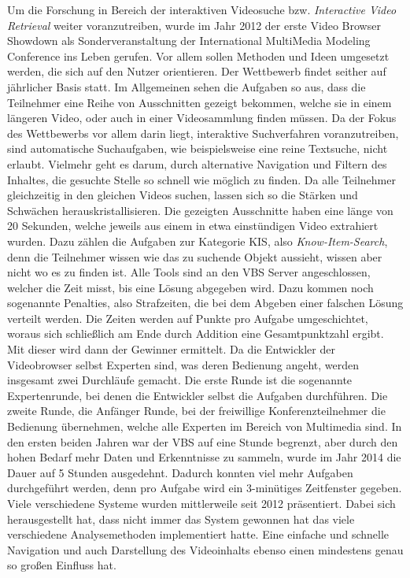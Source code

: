 \documentclass[11pt,a4paper]{report}
\begin{document}
Um die Forschung in Bereich der interaktiven Videosuche bzw. \emph{Interactive Video Retrieval} weiter voranzutreiben, wurde im Jahr 2012 der erste Video Browser Showdown als Sonderveranstaltung der International MultiMedia Modeling Conference ins Leben gerufen. Vor allem sollen Methoden und Ideen umgesetzt werden, die sich auf den Nutzer orientieren. Der Wettbewerb findet seither auf jährlicher Basis statt. Im Allgemeinen sehen die Aufgaben so aus, dass die Teilnehmer eine Reihe von Ausschnitten gezeigt bekommen, welche sie in einem längeren Video, oder auch in einer Videosammlung finden müssen. Da der Fokus des Wettbewerbs vor allem darin liegt, interaktive Suchverfahren voranzutreiben, sind automatische Suchaufgaben, wie beispielsweise eine reine Textsuche, nicht erlaubt. Vielmehr geht es darum, durch alternative Navigation und Filtern des Inhaltes, die gesuchte Stelle so schnell wie möglich zu finden. Da alle Teilnehmer gleichzeitig in den gleichen Videos suchen, lassen sich so die Stärken und Schwächen herauskristallisieren. Die gezeigten Ausschnitte haben eine länge von 20 Sekunden, welche jeweils aus einem in etwa einstündigen Video extrahiert wurden. Dazu zählen die Aufgaben zur Kategorie KIS, also  \emph{Know-Item-Search}, denn die Teilnehmer wissen wie das zu suchende Objekt aussieht, wissen aber nicht wo es zu finden ist. Alle Tools sind an den VBS Server angeschlossen, welcher die Zeit misst, bis eine Lösung abgegeben wird. Dazu kommen noch sogenannte Penalties, also Strafzeiten, die bei dem Abgeben einer falschen Lösung verteilt werden. Die Zeiten werden auf Punkte pro Aufgabe umgeschichtet, woraus sich schließlich am Ende durch Addition eine Gesamtpunktzahl ergibt. Mit dieser wird dann der Gewinner ermittelt. Da die Entwickler der Videobrowser selbst Experten sind, was deren Bedienung angeht, werden insgesamt zwei Durchläufe gemacht. Die erste Runde ist die sogenannte Expertenrunde, bei denen die Entwickler selbst die Aufgaben durchführen. Die zweite Runde, die Anfänger Runde, bei der freiwillige Konferenzteilnehmer die Bedienung übernehmen, welche alle Experten im Bereich von Multimedia sind. In den ersten beiden Jahren war der VBS auf eine Stunde begrenzt, aber durch den hohen Bedarf mehr Daten und Erkenntnisse zu sammeln, wurde im Jahr 2014 die Dauer auf 5 Stunden ausgedehnt. Dadurch konnten viel mehr Aufgaben durchgeführt werden, denn pro Aufgabe wird ein 3-minütiges Zeitfenster gegeben. Viele verschiedene Systeme wurden mittlerweile seit 2012 präsentiert. Dabei sich herausgestellt hat, dass nicht immer das System gewonnen hat das viele verschiedene Analysemethoden implementiert hatte. Eine einfache und schnelle Navigation und auch Darstellung des Videoinhalts ebenso einen mindestens genau so großen Einfluss hat. \cite{schoeffmann2014video} \cite{schoeffmann2014user}
\end{document}
